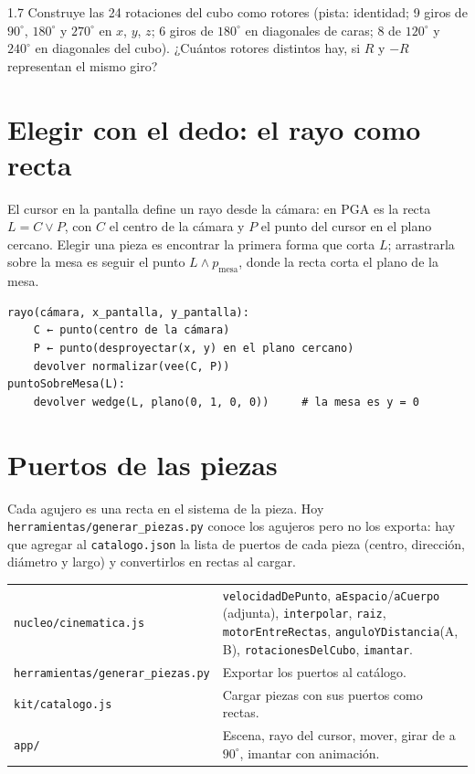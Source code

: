 \documentclass[11pt,a4paper]{article}
\begin{document}
\begin{ejercicio}{1.7}
Construye las 24 rotaciones del cubo como rotores (pista: identidad; 9 giros de $90^\circ$, $180^\circ$ y
$270^\circ$ en $x$, $y$, $z$; 6 giros de $180^\circ$ en diagonales de caras; 8 de $120^\circ$ y $240^\circ$ en
diagonales del cubo). ¿Cuántos rotores distintos hay, si $R$ y $-R$ representan el mismo giro?
\end{ejercicio}

\section{Elegir con el dedo: el rayo como recta}

El cursor en la pantalla define un rayo desde la cámara: en PGA es la recta $L = C\vee P$, con $C$ el centro de la
cámara y $P$ el punto del cursor en el plano cercano. Elegir una pieza es encontrar la primera forma que corta $L$;
arrastrarla sobre la mesa es seguir el punto $L\wedge p_{\text{mesa}}$, donde la recta corta el plano de la mesa.

\begin{codigo}
\begin{lstlisting}
rayo(cámara, x_pantalla, y_pantalla):
    C ← punto(centro de la cámara)
    P ← punto(desproyectar(x, y) en el plano cercano)
    devolver normalizar(vee(C, P))
puntoSobreMesa(L):
    devolver wedge(L, plano(0, 1, 0, 0))     # la mesa es y = 0
\end{lstlisting}
\end{codigo}

\section{Puertos de las piezas}

Cada agujero es una recta en el sistema de la pieza. Hoy \texttt{herramientas/generar\_piezas.py} conoce los
agujeros pero no los exporta: hay que agregar al \texttt{catalogo.json} la lista de puertos de cada pieza (centro,
dirección, diámetro y largo) y convertirlos en rectas al cargar.

\begin{codigo}
\begin{tabularx}{\linewidth}{@{}l Y@{}}
\texttt{nucleo/cinematica.js} & \texttt{velocidadDePunto}, \texttt{aEspacio}/\texttt{aCuerpo} (adjunta),
  \texttt{interpolar}, \texttt{raiz}, \texttt{motorEntreRectas}, \texttt{anguloYDistancia}(A, B),
  \texttt{rotacionesDelCubo}, \texttt{imantar}.\\
\texttt{herramientas/generar\_piezas.py} & Exportar los puertos al catálogo.\\
\texttt{kit/catalogo.js} & Cargar piezas con sus puertos como rectas.\\
\texttt{app/} & Escena, rayo del cursor, mover, girar de a $90^\circ$, imantar con animación.\\
\end{tabularx}
\end{codigo}
\end{document}
